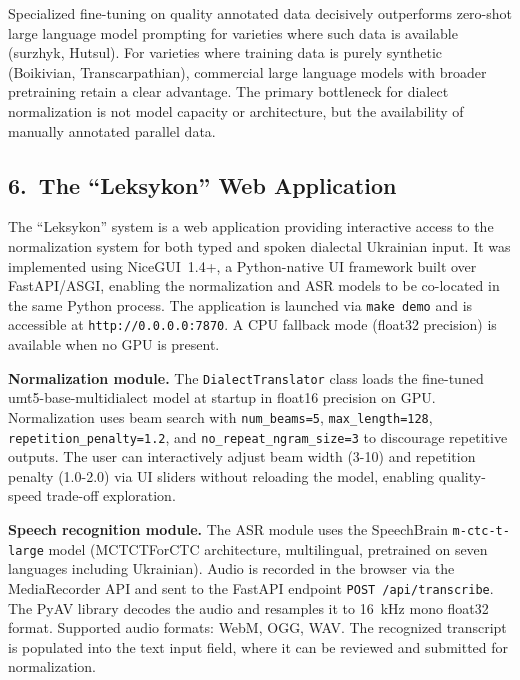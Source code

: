 \documentclass[14pt]{extarticle}
\begin{document}
Specialized fine-tuning on quality annotated data decisively outperforms zero-shot large language
model prompting for varieties where such data is available (surzhyk, Hutsul). For varieties where
training data is purely synthetic (Boikivian, Transcarpathian), commercial large language models
with broader pretraining retain a clear advantage. The primary bottleneck for dialect
normalization is not model capacity or architecture, but the availability of manually annotated
parallel data.

\subsection*{6.~The ``Leksykon'' Web Application}

The ``Leksykon'' system is a web application providing interactive access to the normalization
system for both typed and spoken dialectal Ukrainian input. It was implemented using NiceGUI~1.4+,
a Python-native UI framework built over FastAPI/ASGI, enabling the normalization and ASR models
to be co-located in the same Python process. The application is launched via \texttt{make demo}
and is accessible at \texttt{http://0.0.0.0:7870}. A CPU fallback mode (float32 precision)
is available when no GPU is present.

\textbf{Normalization module.} The \texttt{DialectTranslator} class loads the fine-tuned
umt5-base-multidialect model at startup in float16 precision on GPU. Normalization uses beam
search with \texttt{num\_beams=5}, \texttt{max\_length=128}, \texttt{repetition\_penalty=1.2},
and \texttt{no\_repeat\_ngram\_size=3} to discourage repetitive outputs. The user can interactively
adjust beam width (3-10) and repetition penalty (1.0-2.0) via UI sliders without reloading the
model, enabling quality-speed trade-off exploration.

\textbf{Speech recognition module.} The ASR module uses the SpeechBrain
\texttt{m-ctc-t-large} model (MCTCTForCTC architecture, multilingual, pretrained on seven
languages including Ukrainian). Audio is recorded in the browser via the MediaRecorder API and
sent to the FastAPI endpoint \texttt{POST /api/transcribe}. The PyAV library decodes the audio
and resamples it to 16~kHz mono float32 format. Supported audio formats: WebM, OGG, WAV.
The recognized transcript is populated into the text input field, where it can be reviewed and
submitted for normalization.
\end{document}
